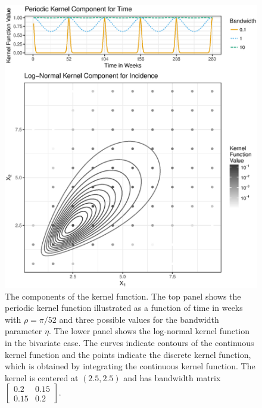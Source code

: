 \documentclass[times, doublespace]{simauth}\usepackage[]{graphicx}\usepackage[]{color}
\makeatletter
\def\maxwidth{ %
  \ifdim\Gin@nat@width>\linewidth
    \linewidth
  \else
    \Gin@nat@width
  \fi
}
\newenvironment{knitrout}{}{} %
\makeatother
\begin{document}
\begin{figure}
\begin{knitrout}
\color{fgcolor}
\includegraphics[width=\maxwidth]{figure/Fig1_Evan_L_Ray_KernelPlot-1} 

\end{knitrout}
\caption{The components of the kernel function.  The top panel shows the
periodic kernel function illustrated as a function of time in weeks with
$\rho = \pi / 52$ and three possible values for the bandwidth parameter
$\eta$.  The lower panel shows the log-normal kernel function in the bivariate
case.  The curves indicate contours of the continuous kernel function and the
points indicate the discrete kernel function, which is obtained by integrating
the continuous kernel function.  The kernel is centered at $(2.5, 2.5)$ and has
bandwidth matrix $\begin{bmatrix}0.2 & 0.15 \\ 0.15 & 0.2\end{bmatrix}$.}
\label{fig:PeriodicKernelPlot}
\end{figure}
\end{document}
